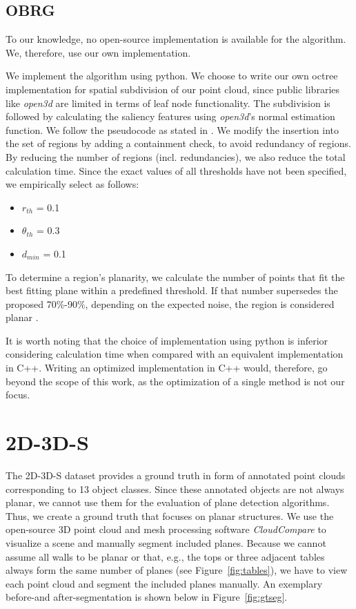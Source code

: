 \documentclass[main.tex]{subfiles}
\begin{document}
\subsection{OBRG}
To our knowledge, no open-source implementation is available for the algorithm.
We, therefore, use our own implementation.

We implement the algorithm using python. We choose to write our own octree implementation for spatial subdivision of our point cloud, since
public libraries like \textit{open3d} are limited in terms of leaf node functionality.
The subdivision is followed by calculating the saliency features using \textit{open3d}'s normal estimation function.
We follow the pseudocode as stated in \cite[Algorithm~1]{Vo_Truong-Hong_Laefer_Bertolotto_2015}. We modify the insertion into the set
of regions by adding a containment check, to avoid redundancy of regions. By reducing the number of regions (incl. redundancies), we also
reduce the total calculation time.
Since the exact values of all thresholds have not been specified, we empirically select as follows:

\begin{itemize}
    \item $r_{th}$ = 0.1
    \item $\theta_{th}$ = 0.3
    \item $d_{min}$ =  0.1
\end{itemize}

To determine a region's planarity, we calculate the number of points that fit the best fitting plane within a predefined threshold.
If that number supersedes the proposed 70\%-90\%, depending on the expected noise, the region is considered planar \cite[Section~3.4]{Vo_Truong-Hong_Laefer_Bertolotto_2015}.

It is worth noting that the choice of implementation using python is inferior considering calculation time when compared with an equivalent implementation in C++. Writing an optimized implementation in C++ would, therefore, go beyond the scope of this work, as the optimization of
a single method is not our focus.



\section{2D-3D-S}
\label{sec:gtseg}
The 2D-3D-S dataset provides a ground truth in form of annotated point clouds corresponding to 13 object classes. Since these annotated objects are not
always planar, we cannot use them for the evaluation of plane detection algorithms. Thus, we create a ground truth that focuses on planar structures.
We use the open-source 3D point cloud and mesh processing software \textit{CloudCompare} to visualize a scene and manually segment included planes.
Because we cannot assume all walls to be planar or that, e.g., the tops or three adjacent tables always form the same number of planes (see Figure~\ref{fig:tables}), we
have to view each point cloud and segment the included planes manually. An exemplary before-and after-segmentation is shown below in Figure~\ref{fig:gtseg}.
\end{document}
